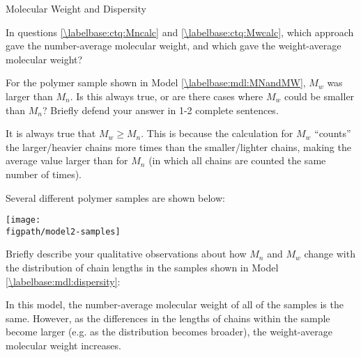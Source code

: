 \begin{activity}{Molecular Weight and Dispersity}
\begin{ctqs}
	\question In questions \ref{\labelbase:ctq:Mncalc} and \ref{\labelbase:ctq:Mwcalc}, which approach gave the number-average molecular weight, and which gave the weight-average molecular weight?
	
		\begin{solution}[1.5in]\end{solution}
	
	\question For the polymer sample shown in Model \ref{\labelbase:mdl:MNandMW}, $M_w$ was larger than $M_n$.  Is this always true, or are there cases where $M_w$ could be smaller than $M_n$?  Briefly defend your answer in 1-2 complete sentences.
	
		\label{\labelbase:ctq:MWvsMN}
		
		\begin{solution}[2in]
		
			It is always true that $M_w \geq M_n$.  This is because the calculation for $M_w$ ``counts'' the larger/heavier chains more times than the smaller/lighter chains, making the average value larger than for $M_n$ (in which all chains are counted the same number of times).
			
		\end{solution}
	
		
\end{ctqs}

\begin{model}
\label{\labelbase:mdl:dispersity}

	Several different polymer samples are shown below:
	
	\vspace{6pt}
	\centerline{\texttt{[image: \\figpath/model2-samples]}}

\end{model}
	
\begin{ctqs}

	\question Briefly describe your qualitative observations about how $M_n$ and $M_w$ change with the distribution of chain lengths in the samples shown in Model \ref{\labelbase:mdl:dispersity}:
	
		\begin{solution}[2in]
			In this model, the number-average molecular weight of all of the samples is the same.  However, as the differences in the lengths of chains within the sample become larger (e.g. as the distribution becomes broader), the weight-average molecular weight increases.
		\end{solution}
	

\end{ctqs}
\end{activity}

